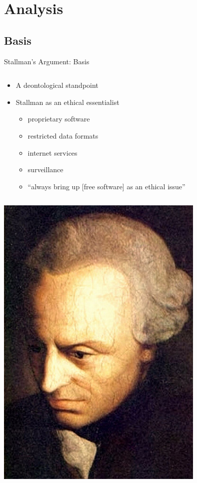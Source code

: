 \section{Analysis}\frame{\sectionpage}

\subsection{Basis}
\begin{frame}{Stallman's Argument: Basis}
  \begin{column}{0.5\textwidth}
    \begin{itemize}
      \item A deontological standpoint
      \item Stallman as an ethical essentialist
        \begin{itemize}
          \item proprietary software
          \item restricted data formats
          \item internet services
          \item surveillance
        \end{itemize}
        \begin{itemize}
          \item ``always bring up [free software] as an ethical issue''~\cite[para. 63]{rms2011}
        \end{itemize}
    \end{itemize}
  \end{column} %
  \begin{column}{0.45\textwidth}\raggedleft
    \includegraphics[width = 0.75\textwidth]{kant.jpg}
  \end{column}
\end{frame}


